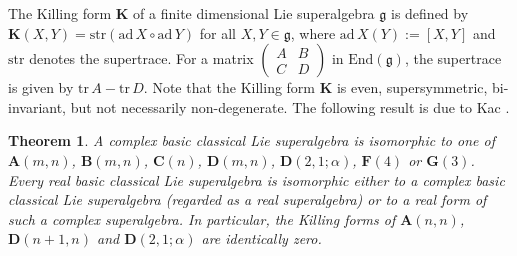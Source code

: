 \documentclass[reqno]{amsart}
\newtheorem{thm}{Theorem}[section]
\theoremstyle{definition}
\begin{document}
The Killing form $\mathbf{K}$ of a finite dimensional Lie superalgebra $\mathfrak{g}$ is defined by $\mathbf{K}(X,Y)=\mathrm{str}(\mathrm{ad}\,X\circ\mathrm{ad}\,Y)$ for all $X,Y\in\mathfrak{g}$,
 where $\mathrm{ad}\,X(Y):=[X,Y]$ and  $\mathrm{str}$ denotes the supertrace.
 For a  matrix
$\left(\begin{array}{cc}
A&B\\
 C&D
\end{array}\right)$
 in $\mathrm{End}(\mathfrak{g})$,
the supertrace is given by $\mathrm{tr}\,A-\mathrm{tr}\,D$. Note that the Killing form $\mathbf{K}$ is even, supersymmetric,  bi-invariant,  but not necessarily non-degenerate. The following result is due to Kac \cite{Kac}.
\begin{thm}
A complex basic classical Lie superalgebra  is isomorphic to one of $\mathbf{A}(m,n)$, $\mathbf{B}(m,n)$, $\mathbf{C}(n)$, $\mathbf{D}(m,n)$, $\mathbf{D}(2,1;\alpha)$, $\mathbf{F}(4)$ or $\mathbf{G}(3)$.
Every real basic classical Lie superalgebra is isomorphic  either to a complex basic classical Lie superalgebra (regarded as a real superalgebra) or to  a real form of such a  complex superalgebra.
In particular, the Killing forms of $\mathbf{A}(n,n)$, $\mathbf{D}(n+1,n)$ and $\mathbf{D}(2,1;\alpha)$ are identically zero.
\end{thm}
\end{document}
